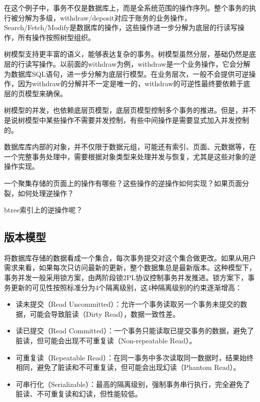 在这个例子中，事务不仅是数据库上，而是全系统范围的操作序列。整个事务的执行被分解为多级，withdraw/deposit对应于账务的业务操作，Search/Fetch/Modify是数据库的操作，这些操作进一步分解为底层的行读写操作，所有操作按照树型组织。

树模型支持更丰富的语义，能够表达复杂的事务。树模型虽然分层，基础仍然是底层的行读写操作。以前面的withdraw为例，withdraw是一个业务操作，它会分解为数据库SQL语句，进一步分解为底层行模型。在业务层次，一般不会提供可逆操作，因为withdraw的分解并不一定是唯一的，withdraw的可逆性最终要依赖于底层的页模型来确保。

树模型的并发，也依赖底层页模型，底层页模型控制多个事务的推进。但是，并不是说树模型中某些操作不需要并发控制，有些中间操作是需要显式加入并发控制的。

数据库库内部的对象，并不仅限于数据元组，可能还有索引、页面、元数据等，在一个完整事务处理中，需要根据对象类型来处理并发与恢复，尤其是这些对象的逆操作实现。

\begin{exercise}
    一个聚集存储的页面上的操作有哪些？这些操作的逆操作如何实现？如果页面分裂，如何处理逆操作？
\end{exercise}
\begin{exercise}
    btree索引上的逆操作呢？
\end{exercise}

\subsection{版本模型}

将数据库存储的数据看成一个集合，每次事务提交对这个集合做更改。如果从用户需求来看，如果每次只访问最新的更新，整个数据集总是最新版本。这种模型下，事务并发一般采用锁方案，由两阶段锁2PL协议控制事务并发推进。锁方案下，事务更新的可见性按照标准分为4个隔离级别，这4种隔离级别的约束逐渐增高：

\begin{itemize}
    \item 读未提交（Read Uncommitted）：允许一个事务读取另一个事务未提交的数据，可能会导致脏读（Dirty Read），数据一致性差。
    \item 读已提交（Read Committed）：一个事务只能读取已提交事务的数据，避免了脏读，但可能会出现不可重复读（Non-repeatable Read）。
    \item 可重复读（Repeatable Read）：在同一事务中多次读取同一数据时，结果始终相同，避免了脏读和不可重复读，但可能会出现幻读（Phantom Read）。
    \item 可串行化（Serializable）：最高的隔离级别，强制事务串行执行，完全避免了脏读、不可重复读和幻读，但性能较低。
\end{itemize}

